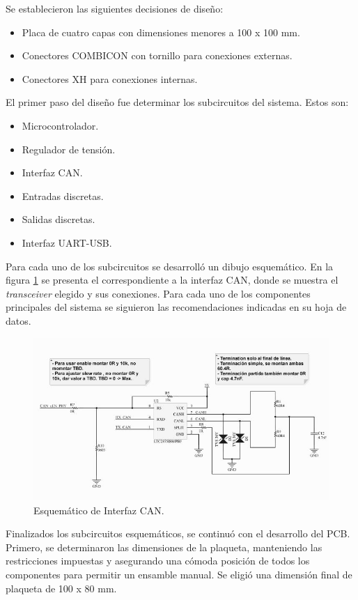Se establecieron las siguientes decisiones de diseño:
\begin{itemize}
	\item Placa de cuatro capas con dimensiones menores a 100 x 100 mm.
	\item Conectores COMBICON con tornillo \citep{web_combicon} para conexiones externas.
	\item Conectores XH \citep{web_xh_connector} para conexiones internas. 
\end{itemize} 

El primer paso del diseño fue determinar los subcircuitos del sistema. Estos son:
\begin{itemize}
	\item Microcontrolador.
	\item Regulador de tensión.
	\item Interfaz CAN.
	\item Entradas discretas.
	\item Salidas discretas.
	\item Interfaz UART-USB.
\end{itemize}

Para cada uno de los subcircuitos se desarrolló un dibujo esquemático. En la figura \ref{fig:esquematico_can} se presenta el correspondiente a la interfaz CAN, donde se muestra el \textit{transceiver} elegido y sus conexiones. Para cada uno de los componentes principales del sistema se siguieron las recomendaciones indicadas en su hoja de datos. 

\begin{figure}[htbp]
	\centering
	\includegraphics[scale=.75]{./Figures/sch_can.JPG}
	\caption{Esquemático de Interfaz CAN.}
	\label{fig:esquematico_can}
\end{figure}

Finalizados los subcircuitos esquemáticos, se continuó con el desarrollo del PCB. Primero, se determinaron las dimensiones de la plaqueta, manteniendo las restricciones impuestas y asegurando una cómoda posición de todos los componentes para permitir un ensamble manual. Se eligió una dimensión final de plaqueta de 100 x 80 mm. 

